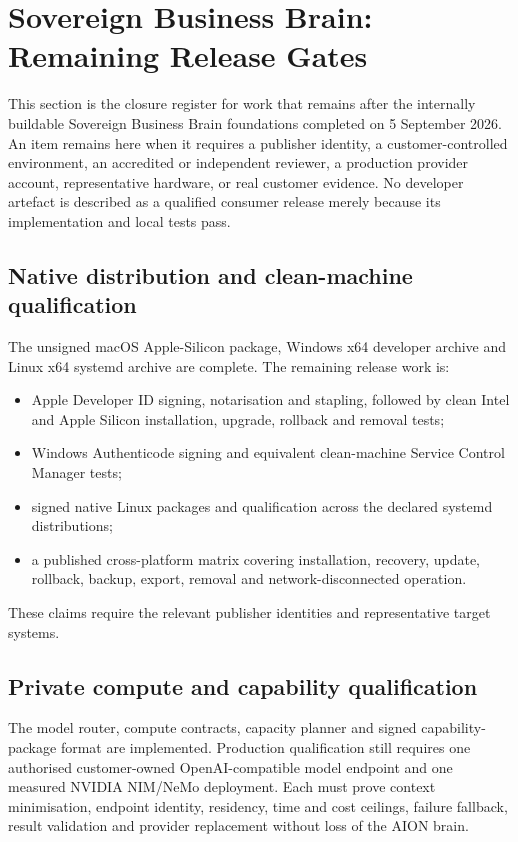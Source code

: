 \section{Sovereign Business Brain: Remaining Release Gates}

This section is the closure register for work that remains after the internally buildable
Sovereign Business Brain foundations completed on 5 September 2026.  An item remains here when it
requires a publisher identity, a customer-controlled environment, an accredited or independent
reviewer, a production provider account, representative hardware, or real customer evidence.  No
developer artefact is described as a qualified consumer release merely because its implementation
and local tests pass.

\subsection{Native distribution and clean-machine qualification}

The unsigned macOS Apple-Silicon package, Windows x64 developer archive and Linux x64 systemd
archive are complete.  The remaining release work is:
\begin{itemize}
  \item Apple Developer ID signing, notarisation and stapling, followed by clean Intel and Apple
        Silicon installation, upgrade, rollback and removal tests;
  \item Windows Authenticode signing and equivalent clean-machine Service Control Manager tests;
  \item signed native Linux packages and qualification across the declared systemd distributions;
  \item a published cross-platform matrix covering installation, recovery, update, rollback,
        backup, export, removal and network-disconnected operation.
\end{itemize}
These claims require the relevant publisher identities and representative target systems.

\subsection{Private compute and capability qualification}

The model router, compute contracts, capacity planner and signed capability-package format are
implemented.  Production qualification still requires one authorised customer-owned
OpenAI-\allowbreak compatible model endpoint and one measured NVIDIA NIM/NeMo deployment. Each must prove
context minimisation, endpoint identity, residency, time and cost ceilings, failure fallback,
result validation and provider replacement without loss of the AION brain.

